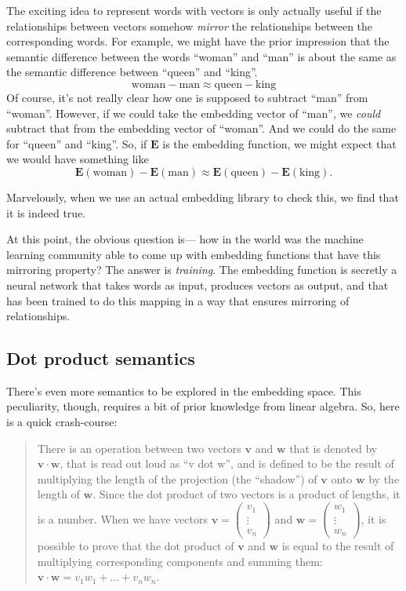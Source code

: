 \documentclass{article}
\begin{document}
The exciting idea to represent words with vectors is only actually useful if the relationships between vectors somehow \textit{mirror} the relationships between the corresponding words. For example, we might have the prior impression that the semantic difference between the words ``woman'' and ``man'' is about the same as the semantic difference between ``queen'' and ``king''.
$$
\text{woman} - \text{man} \approx \text{queen} - \text{king}
$$
Of course, it's not really clear how one is supposed to subtract ``man'' from ``woman''. However, if we could take the embedding vector of ``man'', we \textit{could} subtract that from the embedding vector of ``woman''. And we could do the same for ``queen'' and ``king''. So, if $\mathbf{E}$ is the embedding function, we might expect that we would have something like
$$
\mathbf{E}(\text{woman}) - \mathbf{E}(\text{man}) \approx \mathbf{E}(\text{queen}) - \mathbf{E}(\text{king}).
$$

Marvelously, when we use an actual embedding library to check this, we find that it is indeed true.

At this point, the obvious question is--- how in the world was the machine learning community able to come up with embedding functions that have this mirroring property? The answer is \textit{training}. The embedding function is secretly a neural network that takes words as input, produces vectors as output, and that has been trained to do this mapping in a way that ensures mirroring of relationships.

\subsection*{Dot product semantics}

There's even more semantics to be explored in the embedding space. This peculiarity, though, requires a bit of prior knowledge from linear algebra. So, here is a quick crash-course:

\begin{quote}
There is an operation between two vectors $\mathbf{v}$ and $\mathbf{w}$ that is denoted by $\mathbf{v} \cdot \mathbf{w}$, that is read out loud as ``v dot w'', and is defined to be the result of multiplying the length of the projection (the ``shadow'') of $\mathbf{v}$ onto $\mathbf{w}$ by the length of $\mathbf{w}$. Since the dot product of two vectors is a product of lengths, it is a number. When we have vectors $\mathbf{v} = \begin{pmatrix} v_1 \\ \vdots \\ v_n \end{pmatrix}$ and $\mathbf{w} = \begin{pmatrix} w_1 \\ \vdots \\ w_n \end{pmatrix}$, it is possible to prove that the dot product of $\mathbf{v}$ and $\mathbf{w}$ is equal to the result of multiplying corresponding components and summing them: $\mathbf{v} \cdot \mathbf{w} = v_1 w_1 + \ldots + v_n w_n$.
\end{quote}
\end{document}
